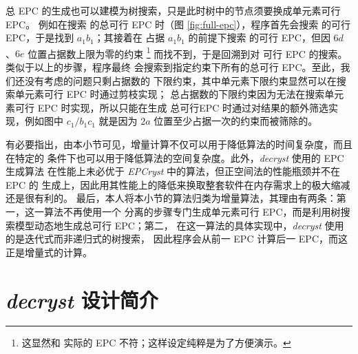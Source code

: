 \begin{figure}[htbp!]
\begin{floatrow}
\setlength{\columnsep}{3em}
\end{floatrow}
\end{figure}

总 EPC 的生成也可以建模为树搜索，只是此时树中的节点须要换成单元素可行 EPC。
例如在搜索  的总可行 EPC 时（图 \ref{fig:full-epc}），程序首先会搜索
 的可行 EPC，于是找到 $a_1b_1$；其接着在  占据 $a_1b_1$
的前提下搜索  的可行 EPC，但因 $6d$、$6e$ 位置占据数上限为零的约束%
\footnote{这显然和  实际的 EPC 不符；这样设定纯粹是为了方便演示。}%
而找不到，于是回溯到对  可行 EPC 的搜索。类似于以上的步骤，程序最终
会搜索到指定约束下所有的总可行 EPC。至此，我们还没有考虑的问题只剩占据数的
下限约束，其中单元素下限约束显然可以在搜索单元素可行 EPC 时通过剪枝实现；
总占据数的下限约束因为无法在搜索单元素可行 EPC 时实现，所以只能在生成
总可行EPC 时通过对结果的额外筛选实现，例如图中 $c_1/b_1c_1$ 就是因为
$2a$ 位置至少占据一次的约束而被筛除的。

有必要指出，由本小节可见，增量计算不仅可以用于降低算法的时间复杂度，而且在特定的
条件下也可以用于降低算法的空间复杂度。此外，\emph{decryst} 使用的 EPC 生成算法
在性能上未必优于 \emph{EPCryst} 中的算法，但正空间法的性能瓶颈并不在 EPC 的
生成上，因此用其性能上的降低来换取整套软件在内存需求上的极大缩减还是很有利的。
最后，本人将本小节的算法归类为增量算法，其理由有两条：第一，这一算法不再使用一个
分离的步骤专门生成单元素可行 EPC，而是利用树搜索模型动态地生成总可行 EPC；第二，
在这一算法的具体实现中，\emph{decryst} 使用的是迭代式而非递归式的树搜索，
因此程序会从前一 EPC 计算后一 EPC，而这正是增量式的计算。

\section{\emph{decryst} 设计简介}
